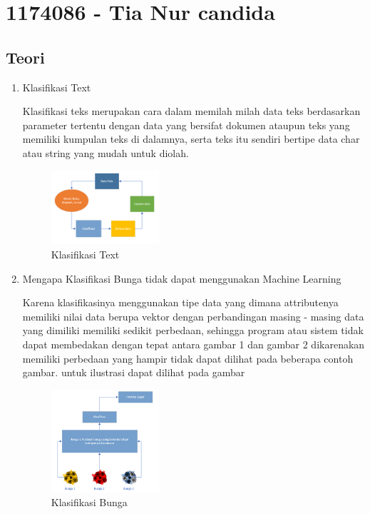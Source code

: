 \section{1174086 - Tia Nur candida}
    \subsection{Teori}
    \begin{enumerate}
        \item Klasifikasi Text
        
        Klasiﬁkasi teks merupakan cara dalam memilah milah data teks berdasarkan parameter tertentu dengan data yang bersifat dokumen ataupun teks yang memiliki kumpulan teks di dalamnya, serta teks itu sendiri bertipe data char atau string yang mudah untuk diolah.
        \begin{figure}[H]
            \includegraphics[width=4cm]{figures/1174086/chapter4/klasifikasi.PNG}
            \centering
            \caption{Klasifikasi Text}
        \end{figure}

        \item Mengapa Klasifikasi Bunga tidak dapat menggunakan Machine Learning
        
        Karena klasiﬁkasinya menggunakan tipe data yang dimana attributenya memiliki nilai data berupa vektor dengan perbandingan masing - masing data yang dimiliki memiliki sedikit perbedaan, sehingga program atau sistem tidak dapat membedakan dengan tepat antara gambar 1 dan gambar 2 dikarenakan memiliki perbedaan yang hampir tidak dapat dilihat pada beberapa contoh gambar. untuk ilustrasi dapat dilihat pada gambar
        \begin{figure}[H]
            \includegraphics[width=4cm]{figures/1174086/chapter4/bunga.PNG}
            \centering
            \caption{Klasifikasi Bunga}
        \end{figure}


\end{enumerate}
